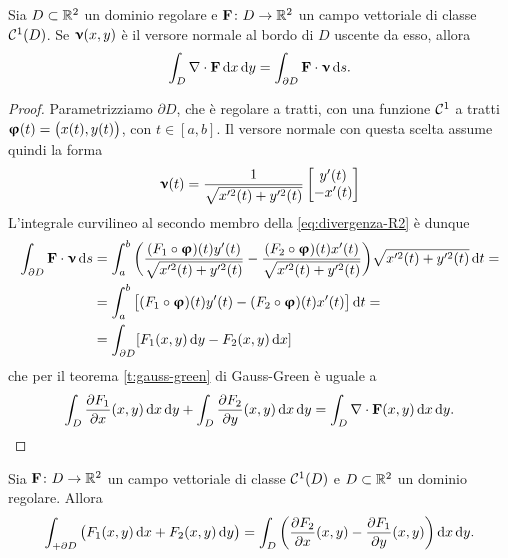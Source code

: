 \begin{teorema} \label{t:divergenza-R2}
	Sia $D\subset\mathbb{R}^2$ un dominio regolare e $\mathbf{F}\colon D\to\mathbb{R}^2$ un campo vettoriale di classe $\mathcal{C}^{{1}}(D)$.
	Se $\bm{\upnu}(x,y)$ è il versore normale al bordo di $D$ uscente da esso, allora
	\begin{equation}
		\int_D\nabla\cdot\mathbf{F}\,\textup{d} x\,\textup{d} y=\int_{\partial D}{\mathbf{F}}\cdot{\bm{\upnu}}\,\textup{d} s.
		\label{eq:divergenza-R2}
	\end{equation}
\end{teorema}
\begin{proof}
	Parametrizziamo $\partial D$, che è regolare a tratti, con una funzione $\mathcal{C}^{{1}}$ a tratti $\bm{\upvarphi}(t)=\big(x(t),y(t)\big)$, con $t\in[a,b]$.
	Il versore normale con questa scelta assume quindi la forma
	\begin{equation*}
		\bm{\upnu}(t)=\frac1{\sqrt{x'^2(t)+y'^2(t)}}
		\begin{bmatrix}
			y'(t)\\-x'(t)
		\end{bmatrix}
	\end{equation*}
	L'integrale curvilineo al secondo membro della \eqref{eq:divergenza-R2} è dunque
	\begin{equation}
		\begin{split}
			\int_{\partial D}{\mathbf{F}}\cdot{\bm{\upnu}}\,\textup{d} s&=\int_a^b\bigg(\frac{(F_1\circ\bm{\upvarphi})(t)y'(t)}{\sqrt{x'^2(t)+y'^2(t)}}-\frac{(F_2\circ\bm{\upvarphi})(t)x'(t)}{\sqrt{x'^2(t)+y'^2(t)}}\bigg)\sqrt{x'^2(t)+y'^2(t)}\,\textup{d} t=\\
			&=\int_a^b\big[(F_1\circ\bm{\upvarphi})(t)y'(t)-(F_2\circ\bm{\upvarphi})(t)x'(t)\big]\,\textup{d} t=\\
			&=\int_{\partial D}[F_1(x,y)\,\textup{d} y-F_2(x,y)\,\textup{d} x]
		\end{split}
	\end{equation}
	che per il teorema \ref{t:gauss-green} di Gauss-Green è uguale a
	\begin{equation}
		\int_D\frac{\partial {F_1}}{\partial {x}}(x,y)\,\textup{d} x\,\textup{d} y+\int_D\frac{\partial {F_2}}{\partial {y}}(x,y)\,\textup{d} x\,\textup{d} y=\int_D\nabla\cdot\mathbf{F}(x,y)\,\textup{d} x\,\textup{d} y.\qedhere
	\end{equation}
\end{proof}
\begin{teorema} \label{t:rotore-R2}
	Sia $\mathbf{F}\colon D\to\mathbb{R}^2$ un campo vettoriale di classe $\mathcal{C}^{{1}}(D)$ e $D\subset\mathbb{R}^2$ un dominio regolare.
	Allora
	\begin{equation}
		\int_{+\partial D}\big(F_1(x,y)\,\textup{d} x+F_2(x,y)\,\textup{d} y\big)=\int_D\bigg(\frac{\partial {F_2}}{\partial {x}}(x,y)-\frac{\partial {F_1}}{\partial {y}}(x,y)\bigg)\,\textup{d} x\,\textup{d} y.
		\label{eq:rotore-R2}
	\end{equation}
\end{teorema}
